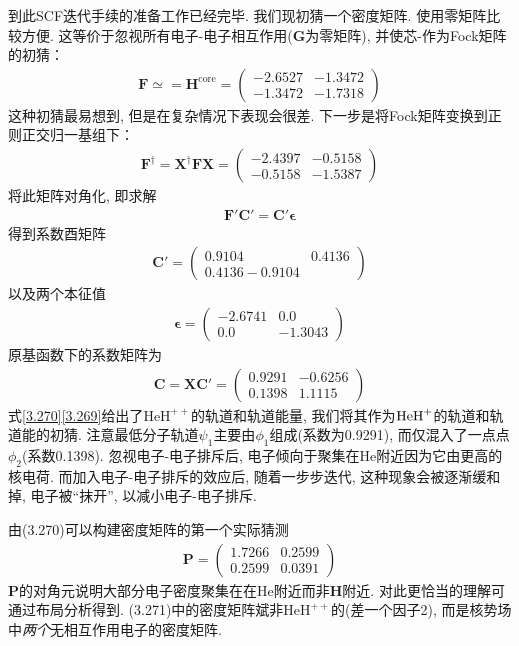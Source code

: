 到此SCF迭代手续的准备工作已经完毕. 我们现初猜一个密度矩阵. 使用零矩阵比较方便. 这等价于忽视所有电子-电子相互作用($\mathbf{G}$为零矩阵), 并使芯-\ha 作为Fock矩阵的初猜：
\begin{align}
\mathbf{F}\simeq=\mathbf{H}^\mathrm{core}=
\begin{pmatrix}
-2.6527&-1.3472\\-1.3472&-1.7318
\end{pmatrix}
\end{align}
这种初猜最易想到, 但是在复杂情况下表现会很差. 下一步是将Fock矩阵变换到正则正交归一基组下：
\begin{align}
\mathbf{F^\dagger=X^\dagger FX}=
\begin{pmatrix}
-2.4397&-0.5158\\-0.5158&-1.5387
\end{pmatrix}
\end{align}
将此矩阵对角化, 即求解
\begin{align}
\mathbf{F'C'=C'}{\boldsymbol\epsilon}
\end{align}
得到系数酉矩阵
\begin{align}
\mathbf{C'}=
\begin{pmatrix}
0.9104&0.4136\\0.4136-0.9104
\end{pmatrix}
\end{align}
以及两个本征值
\begin{align}
\label{3.269}
\bm{\epsilon}=
\begin{pmatrix}
-2.6741&0.0\\0.0&-1.3043
\end{pmatrix}
\end{align}
原基函数下的系数矩阵为
\begin{align}
\mathbf{C=XC'}=
\begin{pmatrix}
0.9291&-0.6256\\0.1398&1.1115
\end{pmatrix}
\end{align}
式\eqref{3.270}\eqref{3.269}给出了$\mathrm{HeH}^{++}$的轨道和轨道能量, 我们将其作为$\mathrm{HeH}^+$的轨道和轨道能的初猜. 注意最低分子轨道$\psi_1$主要由$\phi_1$组成(系数为0.9291), 而仅混入了一点点$\phi_2$(系数0.1398). 忽视电子-电子排斥后, 电子倾向于聚集在$\mathrm{He}$附近因为它由更高的核电荷. 而加入电子-电子排斥的效应后, 随着一步步迭代, 这种现象会被逐渐缓和掉, 电子被``抹开”, 以减小电子-电子排斥.

由(3.270)可以构建密度矩阵的第一个实际猜测
\begin{align}
\mathbf{P}=
\begin{pmatrix}
1.7266&0.2599\\0.2599&0.0391
\end{pmatrix}
\end{align}
$\mathbf{P}$的对角元说明大部分电子密度聚集在在$\mathrm{He}$附近而非$\mathbf{H}$附近. 对此更恰当的理解可通过布局分析得到. (3.271)中的密度矩阵斌非$\mathrm{HeH}^{++}$的(差一个因子2), 而是核势场中\emph{两个}无相互作用电子的密度矩阵.

